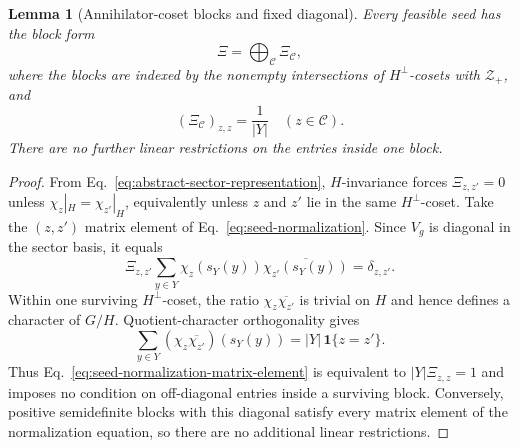 \documentclass[11pt]{article}
\newcommand{\1}{\mathbf 1}
\theoremstyle{plain}
\newtheorem{lemma}[theorem]{Lemma}
\theoremstyle{definition}
\theoremstyle{remark}
\begin{document}
\begin{lemma}[Annihilator-coset blocks and fixed diagonal]
\label{lem:coset-fixed-diagonal}
Every feasible seed has the block form
\begin{equation}
 \Xi=\bigoplus_{\mathcal C}\Xi_{\mathcal C},
 \label{eq:Xi-blocks}
\end{equation}
where the blocks are indexed by the nonempty intersections of
$H^\perp$-cosets with $\mathcal Z_+$, and
\begin{equation}
 (\Xi_{\mathcal C})_{z,z}=\frac1{\lvert Y\rvert}
 \quad(z\in\mathcal C).
 \label{eq:fixed-diagonal}
\end{equation}
There are no further linear restrictions on the entries inside one block.
\end{lemma}
\begin{proof}
From Eq.~\eqref{eq:abstract-sector-representation}, $H$-invariance forces
$\Xi_{z,z'}=0$ unless $\chi_z|_H=\chi_{z'}|_H$, equivalently unless $z$ and
$z'$ lie in the same $H^\perp$-coset.  Take the $(z,z')$ matrix element of
Eq.~\eqref{eq:seed-normalization}.  Since $V_g$ is diagonal in the sector
basis, it equals
\begin{equation}
 \Xi_{z,z'}
 \sum_{y\in Y}
 \chi_z(s_Y(y))\overline{\chi_{z'}(s_Y(y))}
 =\delta_{z,z'}.
 \label{eq:seed-normalization-matrix-element}
\end{equation}
Within one surviving $H^\perp$-coset, the ratio
$\chi_z\overline{\chi_{z'}}$ is trivial on $H$ and hence defines a character
of $G/H$.  Quotient-character orthogonality gives
\begin{equation}
 \sum_{y\in Y}
 (\chi_z\overline{\chi_{z'}})(s_Y(y))
 =\lvert Y\rvert\,\mathbf1\{z=z'\}.
 \label{eq:quotient-character-orthogonality-seed}
\end{equation}
Thus Eq.~\eqref{eq:seed-normalization-matrix-element} is equivalent to
$\lvert Y\rvert\Xi_{z,z}=1$ and imposes no condition on off-diagonal entries inside a
surviving block.  Conversely, positive semidefinite blocks with this diagonal
satisfy every matrix element of the normalization equation, so there are no
additional linear restrictions.
\end{proof}
\end{document}
